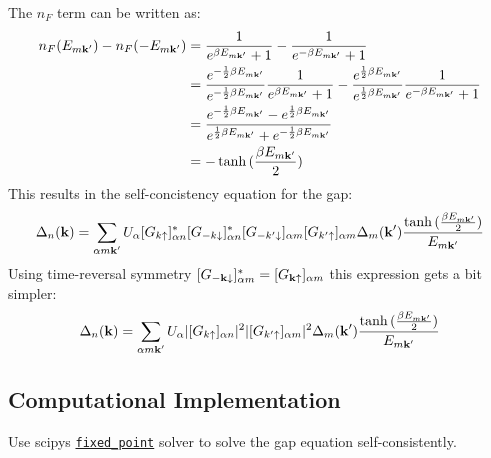The \(n_F\) term can be written as:
\begin{align}
    n_F(E_{m \bm{\mathrm{k}}^{\prime}}) - n_F(-E_{m \bm{\mathrm{k}}^{\prime}}) &= \frac{1}{e^{\beta E_{m \bm{\mathrm{k}}^{\prime}}} + 1} - \frac{1}{e^{-\beta E_{m \bm{\mathrm{k}}^{\prime}}} + 1} \\
    &= \frac{e^{-\frac{1}{2} \beta E_{m \bm{\mathrm{k}}^{\prime} }}}{e^{-\frac{1}{2} \beta E_{m \bm{\mathrm{k}}^{\prime}}}} \frac{1}{e^{\beta E_{m \bm{\mathrm{k}}^{\prime}}} + 1} - \frac{e^{\frac{1}{2} \beta E_{m \bm{\mathrm{k}}^{\prime}}}}{e^{\frac{1}{2} \beta E_{m \bm{\mathrm{k}}^{\prime}}}} \frac{1}{e^{-\beta E_{m \bm{\mathrm{k}}^{\prime}}} + 1} \\
    &= \frac{e^{-\frac{1}{2} \beta E_{m \bm{\mathrm{k}}^{\prime}}} - e^{\frac{1}{2} \beta E_{m \bm{\mathrm{k}}^{\prime}}}}{e^{\frac{1}{2} \beta E_{m \bm{\mathrm{k}}^{\prime}}} + e^{-\frac{1}{2} \beta E_{m \bm{\mathrm{k}}^{\prime} }}} \\
    &= -\tanh{(\frac{\beta E_{m \bm{\mathrm{k}}^{\prime}}}{2})}
\end{align}
This results in the self-concistency equation for the gap:
\begin{align}
    \Delta_n (\bm{\mathrm{k}}) = \sum_{\alpha m \bm{\mathrm{k}}^{\prime}} U_{\alpha} [G_{k \uparrow}]_{\alpha n}^* [G_{-k \downarrow}]_{\alpha n}^* [G_{-k^{\prime} \downarrow}]_{\alpha m} [G_{k^{\prime} \uparrow}]_{\alpha m} \Delta_{m} (\bm{\mathrm{k}}^{\prime}) \frac{\tanh{(\frac{\beta E_{m \bm{\mathrm{k}}^{\prime}}}{2})}}{E_{m \bm{\mathrm{k}}^{\prime}}}
\end{align}
Using time-reversal symmetry \([G_{-\bm{\mathrm{k}} \downarrow}]_{\alpha m}^* = [G_{\bm{\mathrm{k}} \uparrow}]_{\alpha m}\) this expression gets a bit simpler:
\begin{align}
    \Delta_n (\bm{\mathrm{k}}) = \sum_{\alpha m \bm{\mathrm{k}}^{\prime}} U_{\alpha} \vert[G_{k \uparrow}]_{\alpha n} \vert^2 \vert[G_{k^{\prime} \uparrow}]_{\alpha m} \vert^2 \Delta_{m} (\bm{\mathrm{k}}^{\prime}) \frac{\tanh{(\frac{\beta E_{m \bm{\mathrm{k}}^{\prime}}}{2})}}{E_{m \bm{\mathrm{k}}^{\prime}}}
\end{align}

\subsection{Computational Implementation}

Use scipys \href{https://docs.scipy.org/doc/scipy/reference/generated/scipy.optimize.fixed_point.html}{\texttt{fixed\_point}} solver to solve the gap equation self-consistently.

